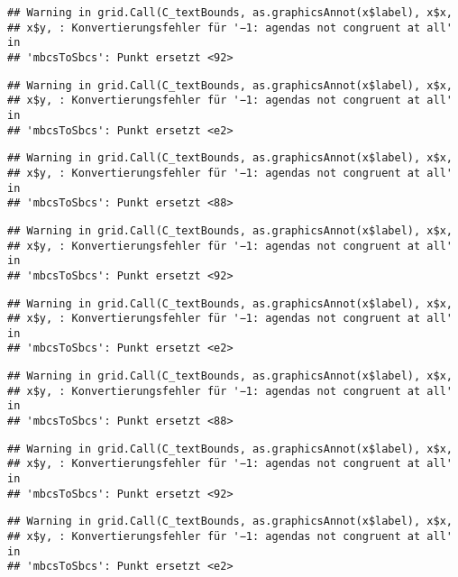 \documentclass[]{article}
\begin{document}
\begin{verbatim}
## Warning in grid.Call(C_textBounds, as.graphicsAnnot(x$label), x$x,
## x$y, : Konvertierungsfehler für '−1: agendas not congruent at all' in
## 'mbcsToSbcs': Punkt ersetzt <92>
\end{verbatim}

\begin{verbatim}
## Warning in grid.Call(C_textBounds, as.graphicsAnnot(x$label), x$x,
## x$y, : Konvertierungsfehler für '−1: agendas not congruent at all' in
## 'mbcsToSbcs': Punkt ersetzt <e2>
\end{verbatim}

\begin{verbatim}
## Warning in grid.Call(C_textBounds, as.graphicsAnnot(x$label), x$x,
## x$y, : Konvertierungsfehler für '−1: agendas not congruent at all' in
## 'mbcsToSbcs': Punkt ersetzt <88>
\end{verbatim}

\begin{verbatim}
## Warning in grid.Call(C_textBounds, as.graphicsAnnot(x$label), x$x,
## x$y, : Konvertierungsfehler für '−1: agendas not congruent at all' in
## 'mbcsToSbcs': Punkt ersetzt <92>
\end{verbatim}

\begin{verbatim}
## Warning in grid.Call(C_textBounds, as.graphicsAnnot(x$label), x$x,
## x$y, : Konvertierungsfehler für '−1: agendas not congruent at all' in
## 'mbcsToSbcs': Punkt ersetzt <e2>
\end{verbatim}

\begin{verbatim}
## Warning in grid.Call(C_textBounds, as.graphicsAnnot(x$label), x$x,
## x$y, : Konvertierungsfehler für '−1: agendas not congruent at all' in
## 'mbcsToSbcs': Punkt ersetzt <88>
\end{verbatim}

\begin{verbatim}
## Warning in grid.Call(C_textBounds, as.graphicsAnnot(x$label), x$x,
## x$y, : Konvertierungsfehler für '−1: agendas not congruent at all' in
## 'mbcsToSbcs': Punkt ersetzt <92>
\end{verbatim}

\begin{verbatim}
## Warning in grid.Call(C_textBounds, as.graphicsAnnot(x$label), x$x,
## x$y, : Konvertierungsfehler für '−1: agendas not congruent at all' in
## 'mbcsToSbcs': Punkt ersetzt <e2>
\end{verbatim}
\end{document}
